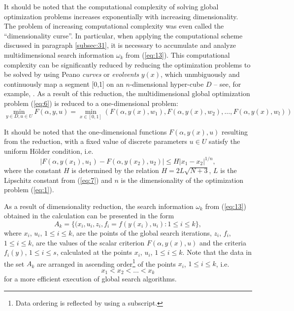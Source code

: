 \documentclass{svproc}
\begin{document}
It should be noted that the computational complexity of solving global optimization problems increases exponentially with increasing dimensionality. The problem of increasing computational complexity was even called the ``dimensionality curse''. In particular, when applying the computational scheme discussed in paragraph \ref{subsec:31}, it is necessary to accumulate and analyze multidimensional search information $\omega_k$ from (\ref{eq:13}). This computational complexity can be significantly reduced by reducing the optimization problems to be solved by using Peano \textit{curves} or \textit{evolvents} $y(x)$, which unmbiguously and continuously map a segment [0,1] on an $n$-dimensional hyper-cube $D$ -- see, for example, \cite{c24,c25}. As a result of this reduction, the multidimensional global optimization problem (\ref{eq:6}) is reduced to a one-dimensional problem:
\begin{equation}\label{eq:15}
 \min_{y\in D, u \in U}F(\alpha,y,u) = \min_{x \in [0,1]}(F(\alpha,y(x),w_1 ),F(\alpha,y(x),w_2 ),\dots,F(\alpha,y(x),w_l ))
\end{equation}

It should be noted that the one-dimensional functions $F(\alpha,y(x),u)$ resulting from the reduction, with a fixed value of discrete parameters $u \in U$ satisfy the uniform H{\" o}lder condition, i.e.
\begin{equation}\label{eq:16}
|F(\alpha, y(x_1),u_1)-F(\alpha, y(x_2),u_2)| \leq H|x_1-x_2 |^{1/n},
\end{equation}
where the constant $H$ is determined by the relation $H=2L\sqrt{N+3}$, $L$ is the Lipschitz constant from (\ref{eq:7}) and $n$ is the dimensionality of the optimization problem (\ref{eq:1}). 

As a result of dimensionality reduction, the search information $\omega_k$ from (\ref{eq:13}) obtained in the calculation can be presented in the form 
\begin{equation}\label{eq:17}
A_k=\{(x_i, u_i, z_i, f_i = f(y(x_i), u_i): 1 \leq i \leq k \},
\end{equation}
where $x_i$, $u_i$, $1 \leq i \leq k$,  are the points of the global search iterations, $z_i$, $f_i$, $1 \leq i \leq k$,  are the values of the scalar criterion $F(\alpha,y(x),u)$ and the criteria $f_i (y)$, $1 \leq i \leq s$, calculated at the points $x_i$, $u_i$, $1 \leq i \leq k$. Note that the data in the set $A_k$ are arranged in ascending order\footnote{Data ordering is reflected by using a subscript.} of the points $x_i$, $1 \leq i \leq k$, i.e.
\begin{equation}\label{eq:18}
 x_1< x_2< \dots < x_k
\end{equation}
for a more efficient execution of global search algorithms.
\end{document}
